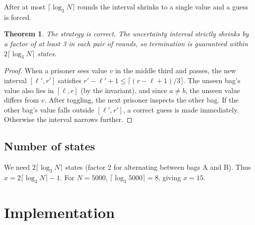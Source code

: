 \documentclass[11pt,a4paper]{article}
\newtheorem{theorem}{Theorem}
\begin{document}
After at most $\lceil \log_3 N \rceil$ rounds the interval shrinks to a
single value and a guess is forced.

\begin{theorem}
The strategy is correct.  The uncertainty interval strictly shrinks by
a factor of at least 3 in each pair of rounds, so termination is
guaranteed within $2\lceil \log_3 N \rceil$ states.
\end{theorem}

\begin{proof}
When a prisoner sees value $v$ in the middle third and passes, the new
interval $[\ell', r']$ satisfies $r' - \ell' + 1 \le \lceil(r - \ell + 1)/3\rceil$.
The unseen bag's value also lies in $[\ell, r]$ (by the invariant), and
since $a \ne b$, the unseen value differs from $v$.  After toggling,
the next prisoner inspects the other bag.  If the other bag's value
falls outside $[\ell', r']$, a correct guess is made immediately.
Otherwise the interval narrows further.
\end{proof}

\subsection{Number of states}

We need $2 \lceil \log_3 N \rceil$ states (factor 2 for alternating
between bags A and B).  Thus $x = 2\lceil \log_3 N \rceil - 1$.
For $N = 5000$, $\lceil \log_3 5000 \rceil = 8$, giving $x = 15$.

\section{Implementation}
\end{document}
